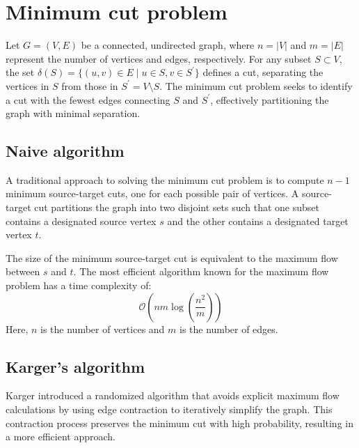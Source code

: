 \section{Minimum cut problem}

Let $G = (V, E)$ be a connected, undirected graph, where $n = \left\lvert V\right\rvert $ and $m = \left\lvert E\right\rvert $ represent the number of vertices and edges, respectively. 
For any subset $S \subset V$, the set $\delta(S) = \{(u, v) \in E \mid u \in S, v \in S^\prime\}$ defines a cut, separating the vertices in $S$ from those in $S^\prime=V\setminus S$. 
The minimum cut problem seeks to identify a cut with the fewest edges connecting $S$ and $S^\prime$, effectively partitioning the graph with minimal separation.

\subsection{Naive algorithm}
A traditional approach to solving the minimum cut problem is to compute $n-1$ minimum source-target cuts, one for each possible pair of vertices.
A source-target cut partitions the graph into two disjoint sets such that one subset contains a designated source vertex $s$ and the other contains a designated target vertex $t$.

The size of the minimum source-target cut is equivalent to the maximum flow between $s$ and $t$. 
The most efficient algorithm known for the maximum flow problem has a time complexity of:
\[\mathcal{O}\left(nm \log\left(\frac{n^2}{m}\right)\right)\]
Here, $n$ is the number of vertices and $m$ is the number of edges. 

\subsection{Karger's algorithm}
Karger introduced a randomized algorithm that avoids explicit maximum flow calculations by using edge contraction to iteratively simplify the graph.
This contraction process preserves the minimum cut with high probability, resulting in a more efficient approach.

